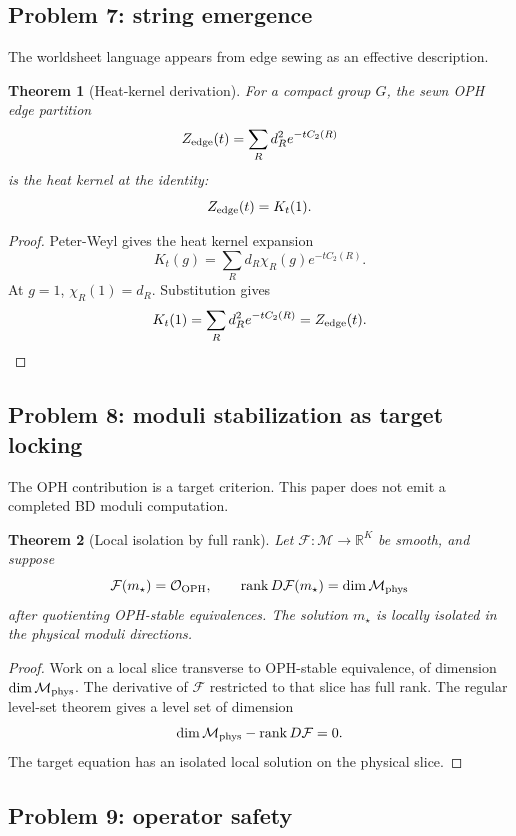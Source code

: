 \documentclass[11pt]{article}
\newtheorem{theorem}{Theorem}[section]
\theoremstyle{remark}
\theoremstyle{plain}
\newcommand{\OPH}{\mathrm{OPH}}
\newcommand{\calF}{\mathcal F}
\newcommand{\calO}{\mathcal O}
\begin{document}
\subsection{Problem 7: string emergence}

The worldsheet language appears from edge sewing as an effective description.

\begin{theorem}[Heat-kernel derivation]
For a compact group \(G\), the sewn OPH edge partition
\[
Z_{\rm edge}(t)=\sum_R d_R^2e^{-tC_2(R)}
\]
is the heat kernel at the identity:
\[
Z_{\rm edge}(t)=K_t(1).
\]
\end{theorem}

\begin{proof}
Peter-Weyl gives the heat kernel expansion
\[
K_t(g)=\sum_R d_R\chi_R(g)e^{-tC_2(R)}.
\]
At \(g=1\), \(\chi_R(1)=d_R\). Substitution gives
\[
K_t(1)=\sum_R d_R^2e^{-tC_2(R)}=Z_{\rm edge}(t).
\]
\end{proof}

\subsection{Problem 8: moduli stabilization as target locking}

The OPH contribution is a target criterion. This paper does not emit a completed BD moduli computation.

\begin{theorem}[Local isolation by full rank]
Let \(\calF:\mathcal M\to\mathbb R^K\) be smooth, and suppose
\[
\calF(m_\star)=\calO_{\OPH},
\qquad
\operatorname{rank}D\calF(m_\star)=\dim\mathcal M_{\rm phys}
\]
after quotienting OPH-stable equivalences. The solution \(m_\star\) is locally isolated in the
physical moduli directions.
\end{theorem}

\begin{proof}
Work on a local slice transverse to OPH-stable equivalence, of dimension
\(\dim\mathcal M_{\rm phys}\). The derivative of \(\calF\) restricted to that slice has full
rank. The regular level-set theorem gives a level set of dimension
\[
\dim\mathcal M_{\rm phys}-\operatorname{rank}D\calF=0.
\]
The target equation has an isolated local solution on the physical slice.
\end{proof}

\subsection{Problem 9: operator safety}
\end{document}
